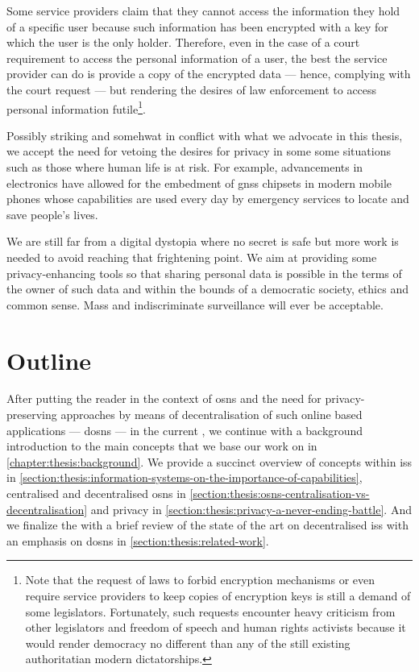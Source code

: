 Some service providers claim that they cannot access the information they hold of 
a specific user because such information has been encrypted with a key for which 
the user is the only holder. Therefore, even in the case of a court requirement 
to access the personal information of a user, the best the service provider can 
do is provide a copy of the encrypted data --- hence, complying with the court request 
--- but rendering the desires of law enforcement to access personal information 
futile\footnote{Note that the request of laws to forbid encryption mechanisms or even require 
service providers to keep copies of encryption keys is still a demand of some legislators. 
Fortunately, such requests encounter heavy criticism from other legislators and 
freedom of speech and human rights activists because it would render democracy no 
different than any of the still existing authoritatian modern dictatorships.}. 

Possibly striking and somehwat in conflict with what we advocate in this thesis, 
we accept the need for vetoing the desires for privacy in some some situations such 
as those where human life is at risk. For example, advancements in electronics have 
allowed for the embedment of \ac{gnss} chipsets in modern mobile phones whose capabilities 
are used every day by emergency services to locate and save people's lives.

We are still far from a digital dystopia where no secret is safe but more work is 
needed to avoid reaching that frightening point. We aim at providing some privacy-enhancing
tools so that sharing personal data is possible in the terms of the owner of such 
data and within the bounds of a democratic society, ethics and common sense. Mass 
and indiscriminate surveillance will ever be acceptable.

\section{Outline}
    \label{section:thesis:outline}
After putting the reader in the context of \acp{osn} and the need for privacy-preserving 
approaches by means of decentralisation of such online based applications --- \acp{dosn} 
--- in the current , we continue with a background 
introduction to the main concepts that we base our work on in \cref{chapter:thesis:background}. 
We provide a succinct overview of concepts within \acp{is} in \cref{section:thesis:information-systems-on-the-importance-of-capabilities}, 
centralised and decentralised \acp{osn} in \cref{section:thesis:osns-centralisation-vs-decentralisation} 
and privacy in \cref{section:thesis:privacy-a-never-ending-battle}. And we finalize 
the  with a brief review of the state of the art 
on decentralised \acp{is} with an emphasis on \acp{dosn} in \cref{section:thesis:related-work}.

